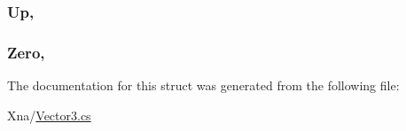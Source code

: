 \subsubsection[{Up}]{ Up\hspace{0.3cm}{\ttfamily [static]}, {\ttfamily [get]}}\label{structMicrosoft_1_1Xna_1_1Framework_1_1Vector3_ae0a5b36870d5f0180840e4c7d3ecae4f}
\hypertarget{structMicrosoft_1_1Xna_1_1Framework_1_1Vector3_adedb40a126cdd1f6f4787b2346b50162}{}
\subsubsection[{Zero}]{ Zero\hspace{0.3cm}{\ttfamily [static]}, {\ttfamily [get]}}\label{structMicrosoft_1_1Xna_1_1Framework_1_1Vector3_adedb40a126cdd1f6f4787b2346b50162}


The documentation for this struct was generated from the following file\+:\begin{DoxyCompactItemize}
\item 
Xna/\hyperlink{Vector3_8cs}{Vector3.\+cs}\end{DoxyCompactItemize}
